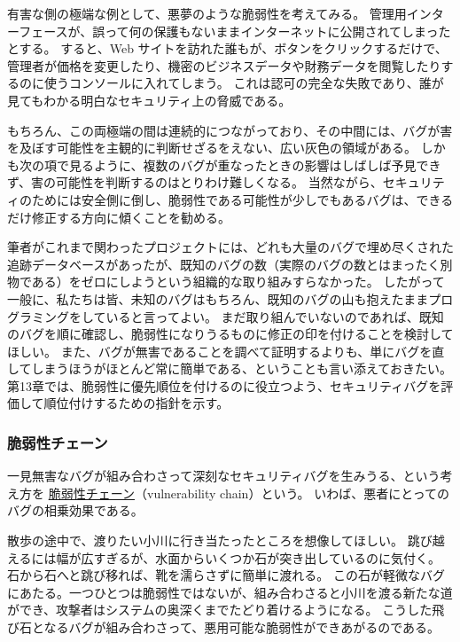 \documentclass[uplatex]{jsarticle}
\def\label#1{}%
\begin{document}
\begin{exa}[管理インターフェースの露出]\label{exa:ch8-exposed-admin}
有害な側の極端な例として、悪夢のような脆弱性を考えてみる。
管理用インターフェースが、誤って何の保護もないままインターネットに公開されてしまったとする。
すると、Web サイトを訪れた誰もが、ボタンをクリックするだけで、管理者が価格を変更したり、機密のビジネスデータや財務データを閲覧したりするのに使うコンソールに入れてしまう。
これは認可の完全な失敗であり、誰が見てもわかる明白なセキュリティ上の脅威である。
\end{exa}

もちろん、この両極端の間は連続的につながっており、その中間には、バグが害を及ぼす可能性を主観的に判断せざるをえない、広い灰色の領域がある。
しかも次の項で見るように、複数のバグが重なったときの影響はしばしば予見できず、害の可能性を判断するのはとりわけ難しくなる。
当然ながら、セキュリティのためには安全側に倒し、脆弱性である可能性が少しでもあるバグは、できるだけ修正する方向に傾くことを勧める。

筆者がこれまで関わったプロジェクトには、どれも大量のバグで埋め尽くされた追跡データベースがあったが、既知のバグの数（実際のバグの数とはまったく別物である）をゼロにしようという組織的な取り組みすらなかった。
したがって一般に、私たちは皆、未知のバグはもちろん、既知のバグの山も抱えたままプログラミングをしていると言ってよい。
まだ取り組んでいないのであれば、既知のバグを順に確認し、脆弱性になりうるものに修正の印を付けることを検討してほしい。
また、バグが無害であることを調べて証明するよりも、単にバグを直してしまうほうがほとんど常に簡単である、ということも言い添えておきたい。
第13章では、脆弱性に優先順位を付けるのに役立つよう、セキュリティバグを評価して順位付けするための指針を示す。

\subsubsection{脆弱性チェーン}

\begin{dfn}[脆弱性チェーン]\label{dfn:ch8-vulnerability-chain}
一見無害なバグが組み合わさって深刻なセキュリティバグを生みうる、という考え方を \underline{脆弱性チェーン}（vulnerability chain）という。
いわば、悪者にとってのバグの相乗効果である。
\end{dfn}

散歩の途中で、渡りたい小川に行き当たったところを想像してほしい。
跳び越えるには幅が広すぎるが、水面からいくつか石が突き出しているのに気付く。
石から石へと跳び移れば、靴を濡らさずに簡単に渡れる。
この石が軽微なバグにあたる。一つひとつは脆弱性ではないが、組み合わさると小川を渡る新たな道ができ、攻撃者はシステムの奥深くまでたどり着けるようになる。
こうした飛び石となるバグが組み合わさって、悪用可能な脆弱性ができあがるのである。
\end{document}
